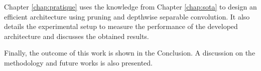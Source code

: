Chapter \ref{chap:pratique} uses the knowledge from Chapter \ref{chap:sota} to design an efficient architecture using pruning and depthwise separable convolution. It also details the experimental setup to measure the performance of the developed architecture and discusses the obtained results.

Finally, the outcome of this work is shown in the Conclusion. A discussion on the methodology and future works is also presented.

\afterpage{\blankpage}
\cleardoublepage
\newpage
